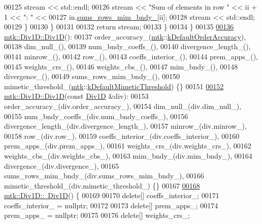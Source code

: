 \begin{DoxyCode}
00125       stream << std::endl;
00126       stream << \textcolor{stringliteral}{"Sum of elements in row "} << ii + 1 << \textcolor{stringliteral}{": "} <<
00127         in.\hyperlink{classmtk_1_1Div1D_aab7f0333d4156efa92e2089295decebc}{sums\_rows\_mim\_bndy\_}[ii];
00128       stream << std::endl;
00129     \}
00130   \}
00131 
00132   \textcolor{keywordflow}{return} stream;
00133 \}
00134 \}
00135 
\hypertarget{mtk__div__1d_8cc_source_l00136}{}\hyperlink{classmtk_1_1Div1D_a339c66dd4ed8f50cbeda3645de18e5ab}{00136} \hyperlink{classmtk_1_1Div1D_a339c66dd4ed8f50cbeda3645de18e5ab}{mtk::Div1D::Div1D}():
00137   order\_accuracy\_(\hyperlink{namespacemtk}{mtk}::\hyperlink{group__c01-roots_ga0d95560098eb36420511103637b6952f}{kDefaultOrderAccuracy}),
00138   dim\_null\_(),
00139   num\_bndy\_coeffs\_(),
00140   divergence\_length\_(),
00141   minrow\_(),
00142   row\_(),
00143   coeffs\_interior\_(),
00144   prem\_apps\_(),
00145   weights\_crs\_(),
00146   weights\_cbs\_(),
00147   mim\_bndy\_(),
00148   divergence\_(),
00149   sums\_rows\_mim\_bndy\_(),
00150   mimetic\_threshold\_(\hyperlink{namespacemtk}{mtk}::\hyperlink{group__c01-roots_ga35718d949bdc81a08a9cc8ebbe3478a2}{kDefaultMimeticThreshold}) \{\}
00151 
\hypertarget{mtk__div__1d_8cc_source_l00152}{}\hyperlink{classmtk_1_1Div1D_a25376152cf97aa27f6b61bcb62b4ea7a}{00152} \hyperlink{classmtk_1_1Div1D_a339c66dd4ed8f50cbeda3645de18e5ab}{mtk::Div1D::Div1D}(\textcolor{keyword}{const} \hyperlink{classmtk_1_1Div1D}{Div1D} &div):
00153   order\_accuracy\_(div.order\_accuracy\_),
00154   dim\_null\_(div.dim\_null\_),
00155   num\_bndy\_coeffs\_(div.num\_bndy\_coeffs\_),
00156   divergence\_length\_(div.divergence\_length\_),
00157   minrow\_(div.minrow\_),
00158   row\_(div.row\_),
00159   coeffs\_interior\_(div.coeffs\_interior\_),
00160   prem\_apps\_(div.prem\_apps\_),
00161   weights\_crs\_(div.weights\_crs\_),
00162   weights\_cbs\_(div.weights\_cbs\_),
00163   mim\_bndy\_(div.mim\_bndy\_),
00164   divergence\_(div.divergence\_),
00165   sums\_rows\_mim\_bndy\_(div.sums\_rows\_mim\_bndy\_),
00166   mimetic\_threshold\_(div.mimetic\_threshold\_) \{\}
00167 
\hypertarget{mtk__div__1d_8cc_source_l00168}{}\hyperlink{classmtk_1_1Div1D_ac2c215f42b8da513df2a4ee477b5fa1f}{00168} \hyperlink{classmtk_1_1Div1D_ac2c215f42b8da513df2a4ee477b5fa1f}{mtk::Div1D::~Div1D}() \{
00169 
00170   \textcolor{keyword}{delete}[] coeffs\_interior\_;
00171   coeffs\_interior\_ = \textcolor{keyword}{nullptr};
00172 
00173   \textcolor{keyword}{delete}[] prem\_apps\_;
00174   prem\_apps\_ = \textcolor{keyword}{nullptr};
00175 
00176   \textcolor{keyword}{delete}[] weights\_crs\_;

\end{DoxyCode}
